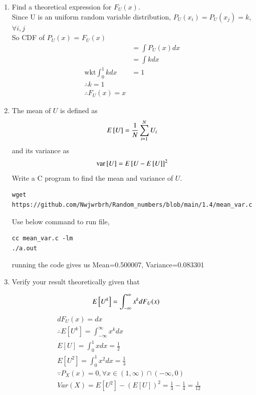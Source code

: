 \documentclass[journal,12pt,twocolumn]{IEEEtran}
\renewcommand\thesection{\arabic{section}}
\begin{document}
\begin{enumerate}[label=\thesection.\arabic*
,ref=\thesection.\theenumi]
\begin{figure}[h]
\caption{The CDF of $U$}
\label{fig:uni_cdf}
\end{figure}
\item
Find a  theoretical expression for $F_{U}(x)$.\\
\solution
Since U is an uniform random variable distribution, $P_{U}(x_{i})=P_{U}(x_{j})=k$, $\forall i,j$\\
So CDF of $P_{U}(x)$ = $F_{U}(x)$
\begin{align}
	&=\int P_{U}(x) dx\\
	&=\int k dx\\
  \text{wkt} \int_{0}^{1} kdx&=1\\
  \therefore k=1\\
  \therefore F_{U}(x)=x
	\end{align}	
\item
The mean of $U$ is defined as
\begin{equation}
E{}\left[U\right] = \frac{1}{N}\sum_{i=1}^{N}U_i
\end{equation}
and its variance as
\begin{equation}
\text{var}{}\left[U\right] = E{}\left[U- E{}\left[U\right]\right]^2 
\end{equation}
Write a C program to  find the mean and variance of $U$. \\
\solution
\begin{lstlisting}
wget https://github.com/Nwjwrbrh/Random_numbers/blob/main/1.4/mean_var.c
\end{lstlisting}
Use below command to run file,
\begin{lstlisting}
cc mean_var.c -lm
./a.out
\end{lstlisting}
running the code gives us Mean=0.500007, Variance=0.083301
\item Verify your result theoretically given that
\end{enumerate}
%
\begin{equation}
E{}\left[U^k\right] = \int_{-\infty}^{\infty}x^kdF_{U}(x)
\end{equation}
\solution
\begin{align}
&dF_{U}(x)=dx\\
&\therefore E[U^k]=\int_{-\infty}^{\infty} x^k dx\\
&E[U]=\int_{0}^{1} x dx=\frac{1}{2}\\
&E[U^2]=\int_{0}^{1} x^2 dx=\frac{1}{3}\\
&\because P_{X}(x)=0 ,\forall x \in (1,\infty)\cap (-\infty,0)\\
&Var(X)=E[U^2]-(E[U])^2=\frac{1}{3}-\frac{1}{4}=\frac{1}{12}
\end{align}
\end{document}
